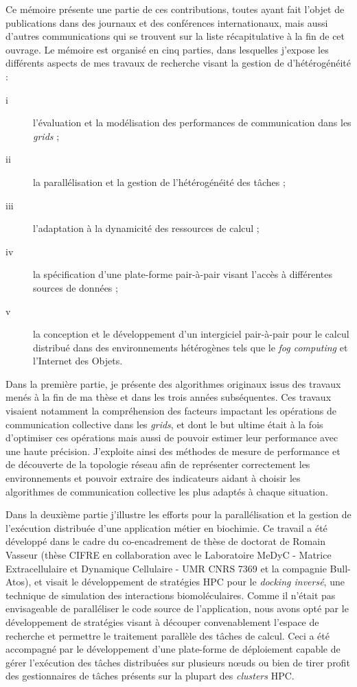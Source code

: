 Ce mémoire présente une partie de ces contributions, toutes ayant fait l'objet de publications dans des journaux et des conférences internationaux, mais aussi d'autres communications qui se trouvent sur la liste récapitulative à la fin de cet ouvrage. Le mémoire est organisé en cinq parties, dans lesquelles j'expose les différents aspects de mes travaux de recherche visant la gestion de d'hétérogénéité :
\begin{description}
	\item[i] l'évaluation et la modélisation des performances de communication dans les \textit{grids} ; 
	\item [ii] la parallélisation et la gestion de l'hétérogénéité des tâches ;
	\item [iii] l'adaptation à la dynamicité des ressources de calcul ;
	\item [iv] la spécification d'une plate-forme pair-à-pair visant l'accès à différentes sources de données ;
	\item [v] la conception et le développement d'un intergiciel pair-à-pair pour le calcul distribué dans des environnements hétérogènes tels que le \textit{fog computing} et l'Internet des Objets.
\end{description}


Dans la première partie, je présente des algorithmes originaux issus des travaux menés à la fin de ma thèse et dans les trois années subséquentes. Ces travaux visaient notamment la compréhension des facteurs impactant les opérations de communication collective dans les \textit{grids}, et dont le but ultime était à la fois d'optimiser ces opérations mais aussi de pouvoir estimer leur performance avec une haute précision.  J'exploite ainsi des méthodes de mesure de performance et de découverte de la topologie réseau afin de représenter correctement les environnements et pouvoir extraire des indicateurs aidant à choisir les algorithmes de communication collective les plus adaptés à chaque situation. 

Dans la deuxième partie j'illustre les efforts pour la parallélisation et la gestion de l'exécution distribuée d'une application métier en biochimie. Ce travail a été développé dans le cadre du co-encadrement de thèse de doctorat de Romain Vasseur (thèse CIFRE en collaboration avec le Laboratoire MeDyC - Matrice Extracellulaire et Dynamique Cellulaire - UMR CNRS 7369 et la compagnie Bull-Atos), et visait le développement de stratégies HPC pour le \textit{docking inversé}, une technique de simulation des interactions biomoléculaires. Comme il n'était pas envisageable de paralléliser le code source de l'application, nous avons opté par le développement de stratégies visant à découper convenablement l'espace de recherche et permettre le traitement parallèle des tâches de calcul. Ceci a été accompagné par le développement d'une plate-forme de déploiement capable de gérer l'exécution des tâches distribuées sur plusieurs n{\oe}uds ou bien de tirer profit des gestionnaires de tâches présents sur la plupart des \textit{clusters} HPC. 

